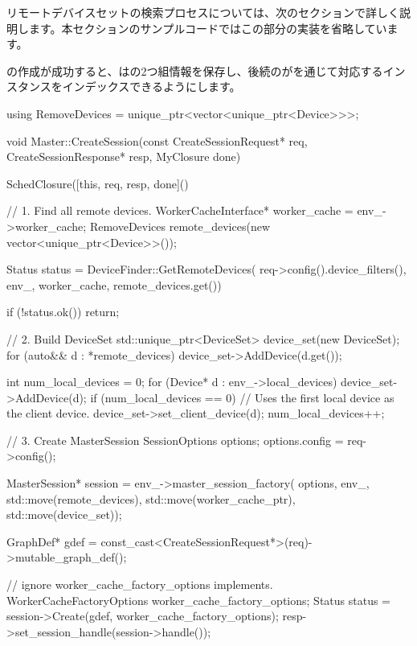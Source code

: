 \begin{content}
\begin{remark}
リモートデバイスセットの検索プロセスについては、次のセクションで詳しく説明します。本セクションのサンプルコードではこの部分の実装を省略しています。
\end{remark}

の作成が成功すると、はの2つ組情報を保存し、後続のがを通じて対応するインスタンスをインデックスできるようにします。

\begin{leftbar}
\begin{c++}
using RemoveDevices = unique_ptr<vector<unique_ptr<Device>>>;

void Master::CreateSession(const CreateSessionRequest* req,
                           CreateSessionResponse* resp, MyClosure done) {
  SchedClosure([this, req, resp, done]() {
    // 1. Find all remote devices. 
    WorkerCacheInterface* worker_cache = env_->worker_cache;
    RemoveDevices remote_devices(new vector<unique_ptr<Device>>());

    Status status = DeviceFinder::GetRemoteDevices(
        req->config().device_filters(), env_,
        worker_cache, remote_devices.get())

    if (!status.ok()) return;

    // 2. Build DeviceSet
    std::unique_ptr<DeviceSet> device_set(new DeviceSet);
    for (auto&& d : *remote_devices) {
      device_set->AddDevice(d.get());
    }

    int num_local_devices = 0;
    for (Device* d : env_->local_devices) {
      device_set->AddDevice(d);
      if (num_local_devices == 0) {
        // Uses the first local device as the client device.
        device_set->set_client_device(d);
      }
      num_local_devices++;
    }

    // 3. Create MasterSession
    SessionOptions options;
    options.config = req->config();
    
    MasterSession* session = env_->master_session_factory(
        options, env_, std::move(remote_devices), 
        std::move(worker_cache_ptr), std::move(device_set));

    GraphDef* gdef =
        const_cast<CreateSessionRequest*>(req)->mutable_graph_def();
    
    // ignore worker\_cache\_factory\_options implements.
    WorkerCacheFactoryOptions worker_cache_factory_options;
    Status status = session->Create(gdef, worker_cache_factory_options);
    resp->set_session_handle(session->handle());
    
}}
\end{c++}
\end{leftbar}
\end{content}
